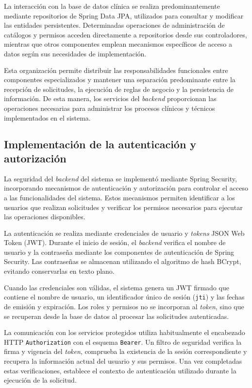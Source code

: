 La interacción con la base de datos
clínica se realiza predominantemente
mediante repositorios de Spring Data JPA,
utilizados para consultar y modificar
las entidades persistentes. Determinadas
operaciones de administración de catálogos
y permisos acceden directamente a
repositorios desde sus controladores,
mientras que otros componentes emplean
mecanismos específicos de acceso a datos
según sus necesidades de implementación.

Esta organización permite distribuir
las responsabilidades funcionales entre
componentes especializados y mantener
una separación predominante entre la
recepción de solicitudes, la ejecución
de reglas de negocio y la persistencia
de información. De esta manera, los
servicios del \textit{backend} proporcionan
las operaciones necesarias para
administrar los procesos clínicos
y técnicos implementados en el sistema.


\subsection{Implementación de la autenticación y autorización}

La seguridad del \textit{backend} del sistema se implementó mediante
Spring Security, incorporando mecanismos de autenticación
y autorización para controlar el acceso a las funcionalidades
del sistema. Estos mecanismos permiten identificar a los
usuarios que realizan solicitudes y verificar los permisos
necesarios para ejecutar las operaciones disponibles.

La autenticación se realiza mediante credenciales de usuario
y \textit{tokens} JSON Web Token (JWT). Durante el inicio de sesión,
el \textit{backend} verifica el nombre de usuario y la contraseña
mediante los componentes de autenticación de Spring Security.
Las contraseñas se almacenan utilizando el algoritmo de
hash BCrypt, evitando conservarlas en texto plano.

Cuando las credenciales son válidas, el sistema genera un
JWT firmado que contiene el nombre de usuario, un
identificador único de sesión (\texttt{jti}) y las fechas
de emisión y expiración. Los roles y permisos no se
incorporan al \textit{token}, sino que se recuperan desde la base
de datos al procesar las solicitudes autenticadas.

La comunicación con los servicios protegidos utiliza
habitualmente el encabezado HTTP \texttt{Authorization}
con el esquema \texttt{Bearer}. Un filtro de seguridad
verifica la firma y vigencia del \textit{token}, comprueba la
existencia de la sesión correspondiente y recupera la
información actual del usuario y sus permisos. Una vez
completadas estas verificaciones, establece el contexto
de autenticación utilizado durante la ejecución de la
solicitud.


